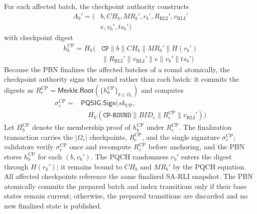 \documentclass[lettersize,journal]{IEEEtran}
\begin{document}
For each affected batch, the checkpoint authority constructs
\begin{equation}
\begin{aligned}
A_b'=\big(&b,CH_b,MR_b',r_b',
R_{\mathrm{RLI}}',v_{\mathrm{RLI}}'\\
&e,v_b',ts_b'\big)
\end{aligned}
\end{equation}
with checkpoint digest
\begin{equation}
\begin{aligned}
h_b^{\mathrm{CP}}=
H_V\big(&\texttt{CP}\parallel b\parallel CH_b\parallel MR_b'
\parallel H(r_b')\\
&\parallel R_{\mathrm{RLI}}'\parallel v_{\mathrm{RLI}}'
\parallel e\parallel v_b'\parallel ts_b'\big)
\end{aligned}
\end{equation}
Because the PBN finalizes the affected batches of a round
atomically, the checkpoint authority signs the round rather than each
batch: it commits the digests as
$R_e^{\mathrm{CP}}=\mathsf{Merkle.Root}(\{h_b^{\mathrm{CP}}\}_{b\in\Omega_e})$
and computes
\begin{equation}
\begin{aligned}
\sigma_e^{\mathrm{CP}}={}&
\mathsf{PQSIG.Sign}\big(sk_{\mathrm{CP}},\\
&\quad H_V(\texttt{CP-ROUND}\parallel BID_e\parallel R_e^{\mathrm{CP}}
\parallel v_{\mathrm{RLI}}')\big)
\end{aligned}
\end{equation}
Let $\Pi_b^{\mathrm{CP}}$ denote the membership proof of
$h_b^{\mathrm{CP}}$ under $R_e^{\mathrm{CP}}$. The finalization
transaction carries the $|\Omega_e|$ checkpoints, $R_e^{\mathrm{CP}}$, and
the single signature $\sigma_e^{\mathrm{CP}}$; validators verify
$\sigma_e^{\mathrm{CP}}$ once and recompute $R_e^{\mathrm{CP}}$ before
anchoring, and the PBN stores $h_b^{\mathrm{CP}}$ for each $(b,v_b')$. The PQCH randomness $r_b'$ enters the digest through $H(r_b')$; it remains
bound to $CH_b$ and $MR_b'$ by the PQCH equation.
All affected checkpoints reference the same finalized SA-RLI snapshot.
The PBN atomically commits the prepared batch and index transitions
only if their base states remain current; otherwise, the prepared
transitions are discarded and no new finalized state is published.
\end{document}

